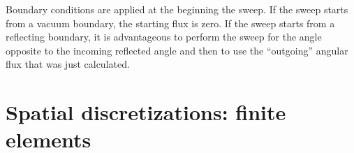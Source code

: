 \documentclass[]{SRJcommon}
\begin{document}
Boundary conditions are applied at the beginning the sweep. If the sweep starts
from a vacuum boundary, the starting flux is zero. If the sweep starts from a
reflecting boundary, it is advantageous to perform the sweep for the
angle opposite to the incoming reflected angle and then to use the ``outgoing''
angular flux that was just calculated.
\section{Spatial discretizations: finite elements}
\nocite{Lew1984}\nocite{Lar2007}


\end{document}
